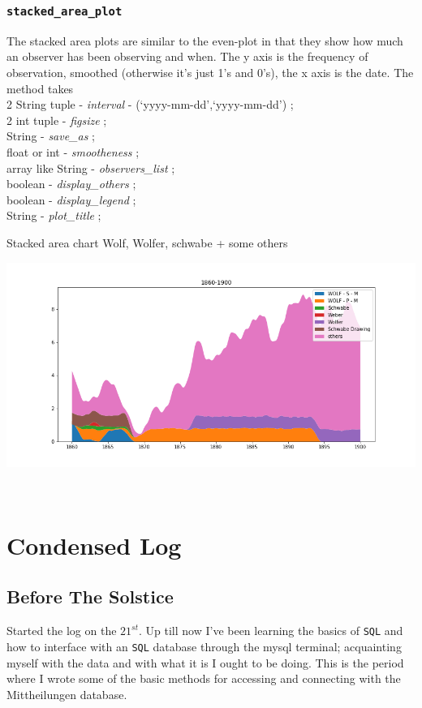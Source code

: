 \documentclass[12pt]{article}
\begin{document}
\subsubsection{\texttt{stacked\_area\_plot}}
The stacked area plots are similar to the even-plot in that they show how much an observer has been observing and when. The y axis is the frequency of observation, smoothed (otherwise it's just 1's and 0's), the x axis is the date. The method takes \\
2 String tuple - \textit{interval} - (`yyyy-mm-dd',`yyyy-mm-dd') ;\\
2 int tuple - \textit{figsize} ;\\
String -  \textit{save\_as} ;\\
float or int - \textit{smootheness} ;\\
array like String - \textit{observers\_list} ; \\
boolean - \textit{display\_others} ; \\
boolean - \textit{display\_legend} ;\\
String - \textit{plot\_title} ;\\

{\centering
\caption{Stacked area chart Wolf, Wolfer, schwabe + some others}
\includegraphics[width=\linewidth]{stacked_wolf_wolfer_schwabe.png}
\label{fig:stacked wolf wolfer schwabe}
\par}\\




\section{Condensed Log}

\subsection{Before The Solstice}
Started the log on the $21^{st}$. Up till now I've been learning the basics of \texttt{SQL} and how to interface with an \texttt{SQL} database through the mysql terminal; acquainting myself with the data and with what it is I ought to be doing. This is the period where I wrote some of the basic methods for accessing and connecting with the Mittheilungen database.
\end{document}
